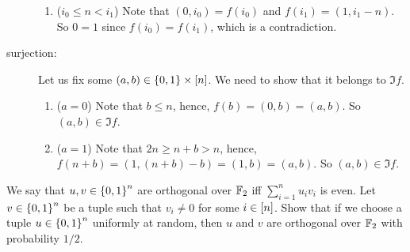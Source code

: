 \begin{chapterendexercises}
\begin{solution}
\begin{description}
\begin{enumerate}
            \item ($i_0 \le n < i_1$) Note that $(0, i_0) = f(i_0)$ and
              $f(i_1) = (1, i_1 - n)$. So $0 = 1$ since $f(i_0) = f(i_1)$, which
              is a contradiction.
          \end{enumerate}
        \item[surjection:]
          Let us fix some $(a, b) \in \set{0, 1} \times \range{n}$. We need to show that
          it belongs to $\Im f$.
          \begin{enumerate}
            \item ($a = 0$) Note that $b \le n$, hence, $f(b) = (0, b) = 
              (a, b)$. So $(a, b) \in \Im f$.
            \item ($a = 1$) Note that $2n \ge n + b > n$, hence,
              $f(n + b) = (1, (n + b) - b) = (1, b) = (a, b)$.
              So $(a, b) \in \Im f$.
          \end{enumerate}
      \end{description}
    \end{solution}
  \exercise We say that $u, v \in \set{0, 1}^n$ are orthogonal over ${\mathbb{F}}_2$ iff
    $\sum_{i = 1}^n u_i v_i$ is even. Let $v \in \set{0, 1}^n$ be a tuple such
    that $v_i \neq 0$ for some $i \in {[{n}]}$. Show that if we choose a
    tuple $u \in \set{0, 1}^n$ uniformly at random, then $u$ and $v$ are
    orthogonal over ${\mathbb{F}}_2$ with probability $1 / 2$.
\end{chapterendexercises}
